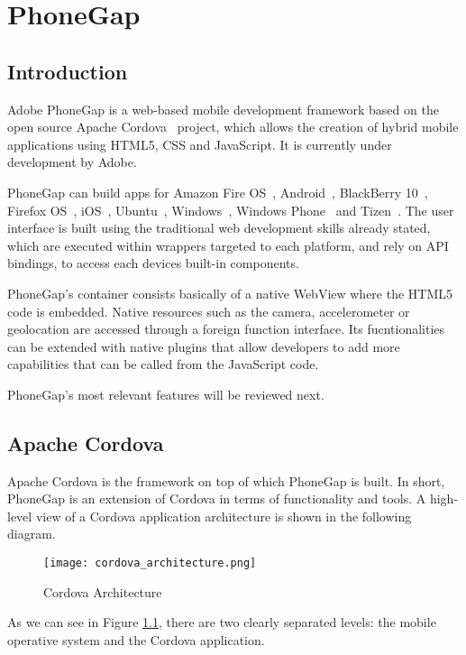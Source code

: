 \chapter{PhoneGap}
\label{ch:phonegap}
\justifying
\section{Introduction}

Adobe PhoneGap is a web-based mobile development framework based on the open source Apache Cordova~\cite{apachecordova} project, which allows the creation of hybrid mobile applications using HTML5, CSS and JavaScript. It is currently under development by Adobe.

PhoneGap can build apps for Amazon Fire OS~\cite{fireos}, Android~\cite{android}, BlackBerry 10~\cite{blackberry10}, Firefox OS~\cite{firefoxos}, iOS~\cite{ios}, Ubuntu~\cite{ubuntu}, Windows~\cite{windows}, Windows Phone~\cite{wp} and Tizen~\cite{tizen}. The user interface is built using the traditional web development skills already stated, which are executed within wrappers targeted to each platform, and rely on API bindings, to access each devices built-in components. 

PhoneGap's container consists basically of a native WebView where the HTML5 code is embedded. Native resources such as the camera, accelerometer or geolocation are accessed through a foreign function interface. Its fucntionalities can be extended with native plugins that allow developers to add more capabilities that can be called from the JavaScript code.

PhoneGap's most relevant features will be reviewed next.

\section{Apache Cordova}

Apache Cordova is the framework on top of which PhoneGap is built. In short, PhoneGap is an extension of Cordova in terms of functionality and tools. A high-level view of a Cordova application architecture is shown in the following diagram.

\begin{figure}[H]
	\centering
	\texttt{[image: cordova\_architecture.png]}
	\caption{Cordova Architecture\label{fig:cordarch}}
\end{figure}

As we can see in Figure \ref{fig:cordarch}, there are two clearly separated levels: the mobile operative system and the Cordova application. 

